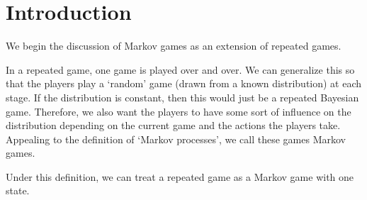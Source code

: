 \section{Introduction}
We begin the discussion of Markov games as an extension of repeated games.

In a repeated game, one game is played over and over. We can generalize this so that the players play a `random' game (drawn from a known distribution) at each stage. If the distribution is constant, then this would just be a repeated Bayesian game. Therefore, we also want the players to have some sort of influence on the distribution depending on the current game and the actions the players take. Appealing to the definition of `Markov processes', we call these games Markov games.
\begin{remark}
    Under this definition, we can treat a repeated game as a Markov game with one state.
\end{remark}

